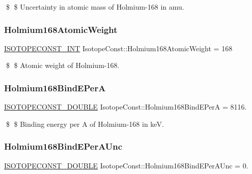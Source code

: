 \$ \$ Uncertainty in atomic mass of Holmium-\/168 in amu. \mbox{\label{group___isotope_const-_holmium-_ho168_gaa305c9e6cb3cbb8e90265706d14aa908}} 
\subsubsection{\texorpdfstring{Holmium168\+Atomic\+Weight}{Holmium168AtomicWeight}}
{\footnotesize\ttfamily \mbox{\hyperlink{group___isotope_const-_macros_ga5f18360b3e99483a35c32d789e62621c}{I\+S\+O\+T\+O\+P\+E\+C\+O\+N\+S\+T\+\_\+\+I\+NT}} Isotope\+Const\+::\+Holmium168\+Atomic\+Weight = 168}

\$ \$ Atomic weight of Holmium-\/168. \mbox{\label{group___isotope_const-_holmium-_ho168_ga39897ba372b19a9915b8af2391d60407}} 
\subsubsection{\texorpdfstring{Holmium168\+Bind\+E\+PerA}{Holmium168BindEPerA}}
{\footnotesize\ttfamily \mbox{\hyperlink{group___isotope_const-_macros_ga8f45a7272ce02c0b4c65c44636ed719a}{I\+S\+O\+T\+O\+P\+E\+C\+O\+N\+S\+T\+\_\+\+D\+O\+U\+B\+LE}} Isotope\+Const\+::\+Holmium168\+Bind\+E\+PerA = 8116.}

\$ \$ Binding energy per A of Holmium-\/168 in keV. \mbox{\label{group___isotope_const-_holmium-_ho168_gaadc9d91298cc92058fc906fc91597363}} 
\subsubsection{\texorpdfstring{Holmium168\+Bind\+E\+Per\+A\+Unc}{Holmium168BindEPerAUnc}}
{\footnotesize\ttfamily \mbox{\hyperlink{group___isotope_const-_macros_ga8f45a7272ce02c0b4c65c44636ed719a}{I\+S\+O\+T\+O\+P\+E\+C\+O\+N\+S\+T\+\_\+\+D\+O\+U\+B\+LE}} Isotope\+Const\+::\+Holmium168\+Bind\+E\+Per\+A\+Unc = 0.}

